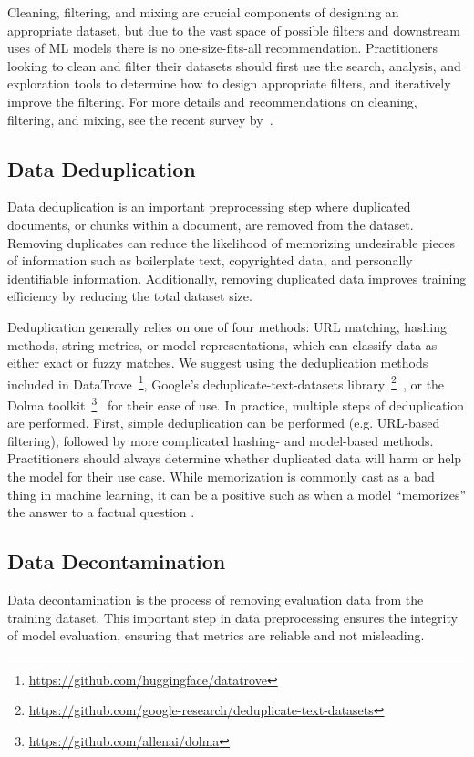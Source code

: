 Cleaning, filtering, and mixing are crucial components of designing an appropriate dataset, but due to the vast space of possible filters and downstream uses of ML models there is no one-size-fits-all recommendation. Practitioners looking to clean and filter their datasets should first use the search, analysis, and exploration tools to determine how to design appropriate filters, and iteratively improve the filtering.
For more details and recommendations on cleaning, filtering, and mixing, see the recent survey by~\citet{albalak2024survey}.


\subsection{Data Deduplication}
Data deduplication is an important preprocessing step where duplicated documents, or chunks within a document, are removed from the dataset. Removing duplicates can reduce the likelihood of memorizing undesirable pieces of information such as boilerplate text, copyrighted data, and personally identifiable information. Additionally, removing duplicated data improves training efficiency by reducing the total dataset size.

Deduplication generally relies on one of four methods: URL matching, hashing methods, string metrics, or model representations, which can classify data as either exact or fuzzy matches. We suggest using the deduplication methods included in DataTrove~\footnote{\url{https://github.com/huggingface/datatrove}}\citep{penedo2024datatrove}, Google's deduplicate-text-datasets library~\footnote{\url{https://github.com/google-research/deduplicate-text-datasets}}~\citep{lee-etal-2022-deduplicating}, or the Dolma toolkit~\footnote{\url{https://github.com/allenai/dolma}}~\citep{dolma} for their ease of use.
In practice, multiple steps of deduplication are performed. First, simple deduplication can be performed (e.g. URL-based filtering), followed by more complicated hashing- and model-based methods.
Practitioners should always determine whether duplicated data will harm or help the model for their use case. While memorization is commonly cast as a bad thing in machine learning, it can be a positive such as when a model ``memorizes'' the answer to a factual question \citep{biderman2024emergent}.

\subsection{Data Decontamination}
Data decontamination is the process of removing evaluation data from the training dataset. This important step in data preprocessing ensures the integrity of model evaluation, ensuring that metrics are reliable and not misleading.

